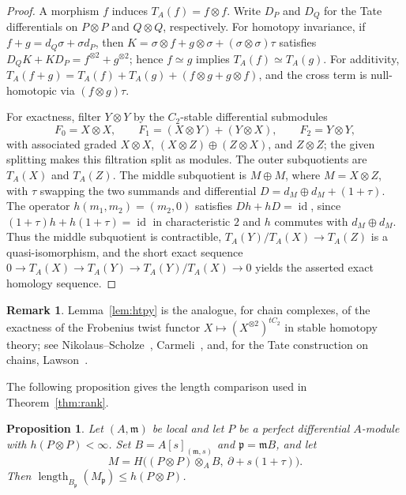 \documentclass[11pt,reqno]{amsart}
\theoremstyle{plain}
\newtheorem{proposition}[theorem]{Proposition}
\theoremstyle{definition}
\newtheorem{remark}[theorem]{Remark}
\DeclareMathOperator{\length}{length}
\DeclareMathOperator{\id}{id}
\newcommand{\Tate}{T}                 %
\newcommand{\htot}{h}
\begin{document}
\begin{proof}
A morphism $f$ induces $\Tate_A(f)=f\otimes f$.  Write $D_P$ and $D_Q$ for the Tate differentials
on $P\otimes P$ and $Q\otimes Q$, respectively.  For homotopy invariance, if
$f+g=d_Q\sigma+\sigma d_P$, then $K=\sigma\otimes f+g\otimes\sigma+(\sigma\otimes\sigma)\tau$ satisfies
$D_QK+KD_P=f^{\otimes2}+g^{\otimes2}$; hence $f\simeq g$ implies
$\Tate_A(f)\simeq\Tate_A(g)$.  For additivity,
$\Tate_A(f+g)=\Tate_A(f)+\Tate_A(g)+(f\otimes g+g\otimes f)$, and the cross term is
null-homotopic via $(f\otimes g)\tau$.

For exactness, filter $Y\otimes Y$ by the $C_2$-stable differential submodules
\[
F_0=X\otimes X,\qquad F_1=(X\otimes Y)+(Y\otimes X),\qquad F_2=Y\otimes Y,
\]
with associated graded $X\otimes X$, $(X\otimes Z)\oplus(Z\otimes X)$, and $Z\otimes Z$; the given
splitting makes this filtration split as modules.  The outer subquotients are $\Tate_A(X)$ and
$\Tate_A(Z)$.  The middle subquotient is $M\oplus M$, where $M=X\otimes Z$, with $\tau$
swapping the two summands and differential $D=d_M\oplus d_M+(1+\tau)$.  The operator
$h(m_1,m_2)=(m_2,0)$ satisfies $Dh+hD=\id$, since $(1+\tau)h+h(1+\tau)=\id$ in characteristic $2$ and
$h$ commutes with $d_M\oplus d_M$.  Thus the middle subquotient is contractible,
$\Tate_A(Y)/\Tate_A(X)\to\Tate_A(Z)$ is a quasi-isomorphism, and the short exact sequence
$0\to\Tate_A(X)\to\Tate_A(Y)\to\Tate_A(Y)/\Tate_A(X)\to0$ yields the asserted exact homology
sequence.
\end{proof}

\begin{remark}
Lemma~\ref{lem:htpy} is the analogue, for chain complexes, of the exactness of the Frobenius twist functor
$X\mapsto(X^{\otimes2})^{tC_2}$ in stable homotopy theory; see
Nikolaus--Scholze~\cite[Proposition~III.1.1]{NS},
Carmeli~\cite[Proposition~2.10]{Carmeli}, and, for the Tate
construction on chains, Lawson~\cite[Proposition~2.13]{Lawson}.
\end{remark}

The following proposition gives the length comparison used in Theorem~\ref{thm:rank}.

\begin{proposition}\label{prop:size}
Let $(A,\mathfrak m)$ be local and let $P$ be a perfect differential $A$-module with
$\htot(P\otimes P)<\infty$.  Set $B=A[s]_{(\mathfrak m,s)}$ and $\mathfrak p=\mathfrak mB$, and let
\[
M=H\bigl((P\otimes P)\otimes_AB,\ \partial+s(1+\tau)\bigr).
\]
Then $\length_{B_{\mathfrak p}}(M_{\mathfrak p})\le\htot(P\otimes P)$.
\end{proposition}
\end{document}
